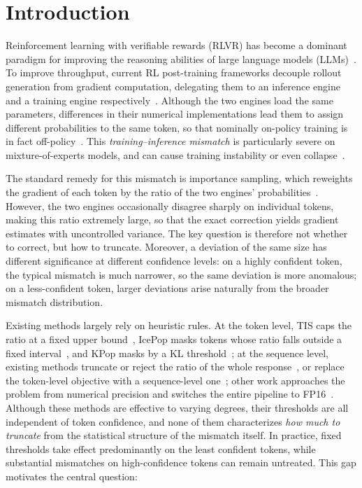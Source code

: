 \section{Introduction}
\label{sec:introduction}

Reinforcement learning with verifiable rewards (RLVR) has become a dominant
paradigm for improving the reasoning abilities of large language models
(LLMs)~\citep{cite}. To improve throughput, current RL post-training frameworks
decouple rollout generation from gradient computation, delegating them to an
inference engine and a training engine respectively~\citep{cite}. Although the
two engines load the same parameters, differences in their numerical
implementations lead them to assign different probabilities to the same token,
so that nominally on-policy training is in fact off-policy~\citep{cite}. This
\emph{training--inference mismatch} is particularly severe on mixture-of-experts
models, and can cause training instability or even collapse~\citep{cite}.

The standard remedy for this mismatch is importance sampling, which reweights
the gradient of each token by the ratio of the two engines'
probabilities~\citep{cite}. However, the two engines occasionally disagree
sharply on individual tokens, making this ratio extremely large, so that the
exact correction yields gradient estimates with uncontrolled variance. The key
question is therefore not whether to correct, but how to truncate. Moreover, a
deviation of the same size has different significance at different confidence
levels: on a highly confident token, the typical mismatch is much narrower, so
the same deviation is more anomalous; on a less-confident token, larger
deviations arise naturally from the broader mismatch distribution.

Existing methods largely rely on heuristic rules. At the token level, TIS caps
the ratio at a fixed upper bound~\citep{cite}, IcePop masks tokens whose ratio
falls outside a fixed interval~\citep{cite}, and KPop masks by a KL
threshold~\citep{cite}; at the sequence level, existing methods truncate or
reject the ratio of the whole response~\citep{cite}, or replace the token-level
objective with a sequence-level one~\citep{cite}; other work approaches the
problem from numerical precision and switches the entire pipeline to
FP16~\citep{cite}. Although these methods are effective to varying degrees,
their thresholds are all independent of token confidence, and none of them
characterizes \emph{how much to truncate} from the statistical structure of the
mismatch itself. In practice, fixed thresholds take effect predominantly on
the least confident tokens, while substantial mismatches on high-confidence
tokens can remain untreated. This gap motivates the central question:

